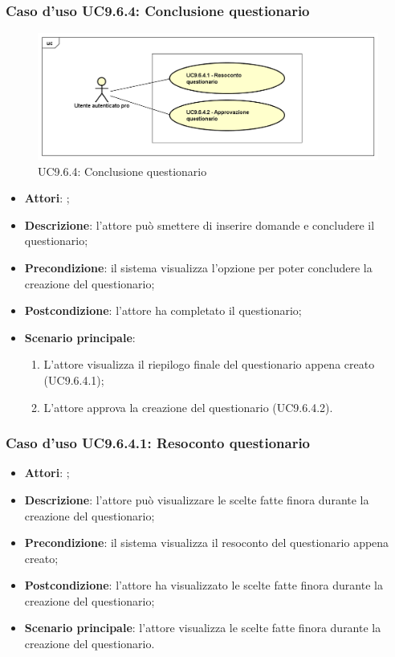 		\subsubsection{Caso d'uso UC9.6.4: Conclusione questionario}
		\label{UC9.6.4}
		\begin{figure}[h]
			\centering
			\includegraphics[scale=0.5,keepaspectratio]{UML/UC9_6_4.png}
			\caption{UC9.6.4: Conclusione questionario}
		\end{figure}
		\FloatBarrier
		\begin{itemize}
			\item \textbf{Attori}: \uaupro{}; 
			\item \textbf{Descrizione}: l'attore può smettere di inserire domande e concludere il questionario;
			\item \textbf{Precondizione}: il sistema visualizza l'opzione per poter concludere la creazione del questionario;
			\item \textbf{Postcondizione}: l'attore ha completato il questionario;
			\item \textbf{Scenario principale}: 
				\begin{enumerate}
					\item L'attore visualizza il riepilogo finale del questionario appena creato (UC9.6.4.1); 
					\item L'attore approva la creazione del questionario (UC9.6.4.2).
				\end{enumerate}
		\end{itemize}
				
			\subsubsection{Caso d'uso UC9.6.4.1: Resoconto questionario}
			\label{UC9.6.4.1}
			\begin{itemize}
				\item \textbf{Attori}: \uaupro{};
				\item \textbf{Descrizione}: l'attore può visualizzare le scelte fatte finora durante la creazione del questionario;
				\item \textbf{Precondizione}: il sistema visualizza il resoconto del questionario appena creato;
				\item \textbf{Postcondizione}: l'attore ha visualizzato le scelte fatte finora durante la creazione del questionario;
				\item \textbf{Scenario principale}: l'attore visualizza le scelte fatte finora durante la creazione del questionario.
			\end{itemize}
			
